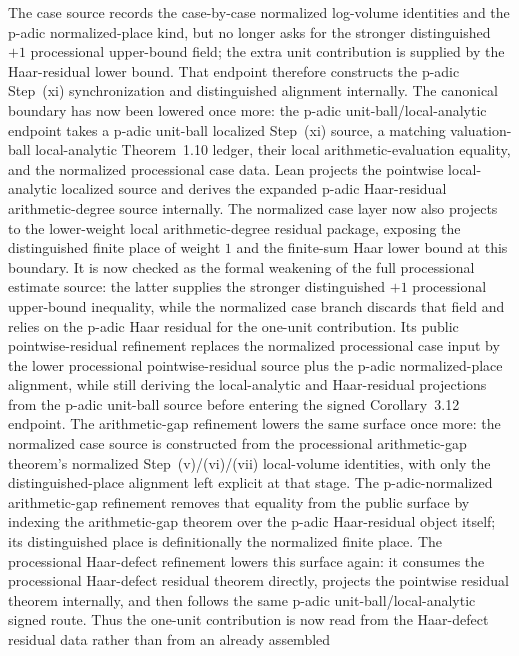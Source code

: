 \documentclass[11pt]{article}
\theoremstyle{plain}
\theoremstyle{definition}
\theoremstyle{remark}
\begin{document}
The case source records the case-by-case normalized log-volume identities and
the p-adic normalized-place kind, but no longer asks for the stronger
distinguished \(+1\) processional upper-bound field; the extra unit
contribution is supplied by the Haar-residual lower bound.  That endpoint
therefore constructs the p-adic Step~(xi) synchronization and distinguished
alignment internally.  The canonical boundary has now been lowered once more: the
p-adic unit-ball/local-analytic endpoint takes a p-adic unit-ball localized
Step~(xi) source, a matching valuation-ball local-analytic Theorem~1.10
ledger, their local arithmetic-evaluation equality, and the normalized
processional case data.  Lean projects the pointwise local-analytic localized
source and derives the expanded p-adic Haar-residual arithmetic-degree source
internally.  The normalized case layer now also projects to the lower-weight
local arithmetic-degree residual package, exposing the distinguished finite
place of weight \(1\) and the finite-sum Haar lower bound at this boundary.
It is now checked as the formal weakening of the full processional estimate
source: the latter supplies the stronger distinguished \(+1\) processional
upper-bound inequality, while the normalized case branch discards that field
and relies on the p-adic Haar residual for the one-unit contribution.
Its public pointwise-residual refinement replaces the normalized
processional case input by the lower processional pointwise-residual source
plus the p-adic normalized-place alignment, while still deriving the
local-analytic and Haar-residual projections from the p-adic unit-ball source
before entering the signed Corollary~3.12 endpoint.  The arithmetic-gap
refinement lowers the same surface once more: the normalized case source is
constructed from the processional arithmetic-gap theorem's normalized
Step~(v)/(vi)/(vii) local-volume identities, with only the distinguished-place
alignment left explicit at that stage.  The p-adic-normalized arithmetic-gap
refinement removes that equality from the public surface by indexing the
arithmetic-gap theorem over the p-adic Haar-residual object itself; its
distinguished place is definitionally the normalized finite place.  The processional
Haar-defect refinement lowers this surface again: it consumes the
processional Haar-defect residual theorem directly, projects the pointwise
residual theorem internally, and then follows the same p-adic
unit-ball/local-analytic signed route.  Thus the one-unit contribution is now
read from the Haar-defect residual data rather than from an already assembled
\end{document}
